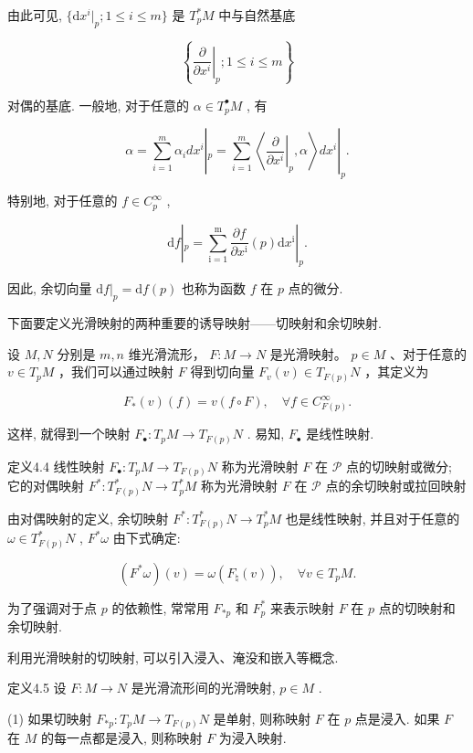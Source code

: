 由此可见,  $\{\mathrm{d}x^i|_p; 1 \leqslant i \leqslant m\}$  是  $T_p^*M$  中与自然基底

$$
\left\{\left. \frac {\partial}{\partial x ^ {i}} \right| _ {p}; 1 \leqslant i \leqslant m \right\}
$$

对偶的基底. 一般地, 对于任意的  $\alpha \in T_{p}^{\bullet}M$ , 有

$$
\alpha = \sum_ {i = 1} ^ {m} \alpha_ {i} d x ^ {i} | _ {p} = \sum_ {i = 1} ^ {m} \left\langle \left. \frac {\partial}{\partial x ^ {i}} \right| _ {p}, \alpha \right\rangle d x ^ {i} | _ {p}.
$$

特别地, 对于任意的  $f \in C_{p}^{\infty}$ ,

$$
\mathrm {d} f | _ {p} = \sum_ {\mathrm {i} = 1} ^ {\mathrm {m}} \frac {\partial f}{\partial x ^ {\mathrm {i}}} (p) \mathrm {d} x ^ {\mathrm {i}} | _ {p}.
$$

因此, 余切向量  $\mathrm{d}f|_{p} = \mathrm{d}f(p)$  也称为函数  $f$  在  $p$  点的微分.

下面要定义光滑映射的两种重要的诱导映射——切映射和余切映射.

设  $M, N$  分别是  $m, n$  维光滑流形， $F: M \to N$  是光滑映射。 $p \in M$ 、对于任意的  $v \in T_pM$ ，我们可以通过映射  $F$  得到切向量  $F_v(v) \in T_{F(p)}N$ ，其定义为

$$
F _ {*} (v) (f) = v (f \circ F), \quad \forall f \in C _ {F (p)} ^ {\infty}.
$$

这样, 就得到一个映射  $F_{\bullet}: T_pM \to T_{F(p)}N$ . 易知,  $F_{\bullet}$  是线性映射.

定义4.4 线性映射  $F_{\bullet}:T_{p}M\to T_{F(p)}N$  称为光滑映射  $F$  在  $\mathcal{P}$  点的切映射或微分; 它的对偶映射  $F^{*}:T_{F(p)}^{*}N\to T_{p}^{*}M$  称为光滑映射 $F$  在  $\mathcal{P}$  点的余切映射或拉回映射

由对偶映射的定义, 余切映射  $F^{*}: T_{F(p)}^{*}N \to T_{p}^{*}M$  也是线性映射, 并且对于任意的  $\omega \in T_{F(p)}^{*}N$ ,  $F^{*}\omega$  由下式确定:

$$
(F ^ {*} \omega) (v) = \omega \left(F _ {\natural} (v)\right), \quad \forall v \in T _ {p} M.
$$

为了强调对于点  $p$  的依赖性, 常常用  $F_{*p}$  和  $F_{p}^{*}$  来表示映射  $F$  在  $p$  点的切映射和余切映射.

利用光滑映射的切映射, 可以引入浸入、淹没和嵌入等概念.

定义4.5 设  $F: M \to N$  是光滑流形间的光滑映射,  $p \in M$ .

(1) 如果切映射  $F_{*p}: T_pM \to T_{F(p)}N$  是单射, 则称映射  $F$  在  $p$  点是浸入. 如果  $F$  在  $M$  的每一点都是浸入, 则称映射  $F$  为浸入映射.

